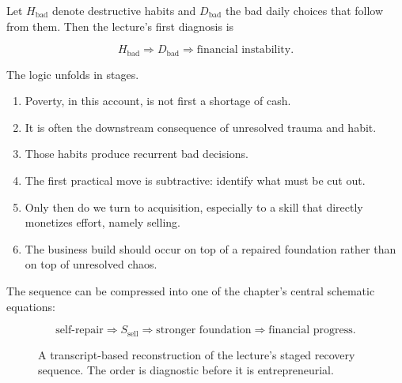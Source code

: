 Let \(H_{\text{bad}}\) denote destructive habits and \(D_{\text{bad}}\) the bad daily choices that follow from them. Then the lecture's first diagnosis is

\begin{equation}
H_{\text{bad}} \Rightarrow D_{\text{bad}} \Rightarrow \text{financial instability}.
\end{equation}

The logic unfolds in stages.

\begin{enumerate}
\item Poverty, in this account, is not first a shortage of cash.
\item It is often the downstream consequence of unresolved trauma and habit.
\item Those habits produce recurrent bad decisions.
\item The first practical move is subtractive: identify what must be cut out.
\item Only then do we turn to acquisition, especially to a skill that directly monetizes effort, namely selling.
\item The business build should occur on top of a repaired foundation rather than on top of unresolved chaos.
\end{enumerate}

The sequence can be compressed into one of the chapter's central schematic equations:

\begin{equation}
\text{self-repair} \Rightarrow S_{\text{sell}} \Rightarrow \text{stronger foundation} \Rightarrow \text{financial progress}.
\end{equation}

\begin{figure}[h]
\centering
{}
\caption{A transcript-based reconstruction of the lecture's staged recovery sequence. The order is diagnostic before it is entrepreneurial.}
\end{figure}

